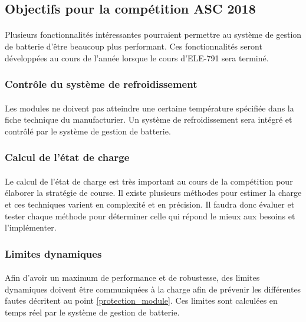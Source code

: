 	\subsection{Objectifs pour la compétition ASC 2018}

		\paragraph{}
		Plusieurs fonctionnalités intéressantes pourraient permettre au système de gestion de batterie d'être beaucoup plus performant. Ces fonctionnalités seront développées au cours de l'année lorsque le cours d'ELE-791 sera terminé. 
		
		\subsubsection{Contrôle du système de refroidissement}
		
			\paragraph{}
			Les modules ne doivent pas atteindre une certaine température spécifiée dans la fiche technique du manufacturier. Un système de refroidissement sera intégré et contrôlé par le système de gestion de batterie. 
			
		\subsubsection{Calcul de l'état de charge}
		
			\paragraph{}
			Le calcul de l'état de charge est très important au cours de la compétition pour élaborer la stratégie de course. Il existe plusieurs méthodes pour estimer la charge et ces techniques varient en complexité et en précision. Il faudra donc évaluer et tester chaque méthode pour déterminer celle qui répond le mieux aux besoins et l'implémenter. 
			
		\subsubsection{Limites dynamiques}
	
			\paragraph{}
			Afin d'avoir un maximum de performance et de robustesse, des limites dynamiques doivent être communiquées à la charge afin de prévenir les différentes fautes décritent au point \ref{protection_module}. Ces limites sont calculées en temps réel par le système de gestion de batterie.
			
